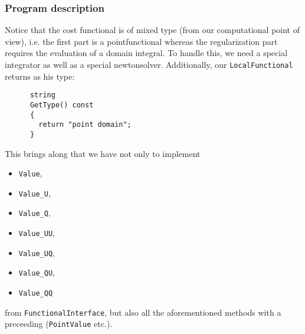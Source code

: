 \subsubsection{Program description}
Notice that the cost functional is of mixed type (from our computational point of view), i.e. the first part is a pointfunctional whereas the regularization part requires the evaluation of a domain integral. To handle this, we need a special integrator as well as a special newtonsolver. Additionally, our \texttt{LocalFunctional} returns as his type:
\begin{verbatim}
      string
      GetType() const
      {
        return "point domain";
      }
\end{verbatim}
This brings along that we have not only to implement 
\begin{itemize} 
\item \texttt{Value},
\item  \texttt{Value\_U},
\item \texttt{Value\_Q}, 
\item \texttt{Value\_UU},
\item \texttt{Value\_UQ},
\item \texttt{Value\_QU},
\item \texttt{Value\_QQ}
\end{itemize}
 from \texttt{FunctionalInterface}, but also all the aforementioned methods with a preceeding  (\texttt{PointValue} etc.).

